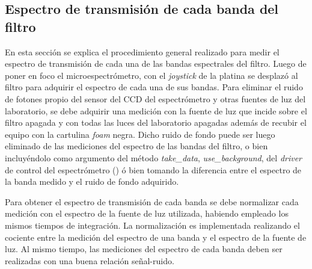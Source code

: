 
\singlespacing
\subsection{Espectro de transmisión de cada banda del filtro \href{https://github.com/jrr1984/open_frame_XYStage/blob/master/plot_spectrum_bands/plot_spectrum_bands.py}{\faGithub}}
\label{sec:espectransm}

\hspace{0.5cm}En esta sección se explica el procedimiento general realizado para medir el espectro de transmisión de cada una de las bandas espectrales del filtro. Luego de poner en foco el microespectrómetro, con el \textit{joystick} de la platina se desplazó al filtro para adquirir el espectro de cada una de sus bandas. Para eliminar el ruido de fotones propio del sensor del CCD del espectrómetro y otras fuentes de luz del laboratorio, se debe adquirir una medición con la fuente de luz que incide sobre el filtro apagada y con todas las luces del laboratorio apagadas además de recubir el equipo con la cartulina \textit{foam} negra. Dicho ruido de fondo puede ser luego eliminado de las mediciones del espectro de las bandas del filtro, o bien incluyéndolo como argumento del método \textit{take\_data}, \textit{use\_background}, del \textit{driver} de control del espectrómetro (\href{https://github.com/jrr1984/open\_frame\_XYStage/blob/master/XYStageAndSpec.py}{\faGithub}) ó bien tomando la diferencia entre el espectro de la banda medido y el ruido de fondo adquirido.

Para obtener el espectro de transmisión de cada banda se debe normalizar cada medición con el espectro de la fuente de luz utilizada, habiendo empleado los mismos tiempos de integración. La normalización es implementada realizando el cociente entre la medición del espectro de una banda y el espectro de la fuente de luz. Al mismo tiempo, las mediciones del espectro de cada banda deben ser realizadas con una buena relación señal-ruido.

